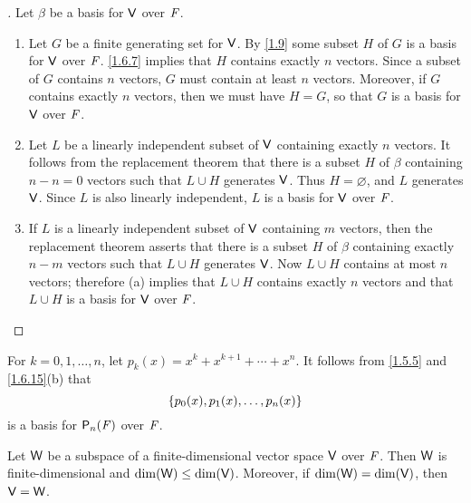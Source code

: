 \begin{proof}[]
	Let \(\beta\) be a basis for \(\mathsf{V}\) over \(\mathit{F}\).
	\begin{enumerate}
		\item Let \(G\) be a finite generating set for \(\mathsf{V}\).
		      By \cref{1.9} some subset \(H\) of \(G\) is a basis for \(\mathsf{V}\) over \(\mathit{F}\).
		      \cref{1.6.7} implies that \(H\) contains exactly \(n\) vectors.
		      Since a subset of \(G\) contains \(n\) vectors, \(G\) must contain at least \(n\) vectors.
		      Moreover, if \(G\) contains exactly \(n\) vectors, then we must have \(H = G\), so that \(G\) is a basis for \(\mathsf{V}\) over \(\mathit{F}\).
		\item Let \(L\) be a linearly independent subset of \(\mathsf{V}\) containing exactly \(n\) vectors.
		      It follows from the replacement theorem that there is a subset \(H\) of \(\beta\) containing \(n - n = 0\) vectors such that \(L \cup H\) generates \(\mathsf{V}\).
		      Thus \(H = \varnothing\), and \(L\) generates \(\mathsf{V}\).
		      Since \(L\) is also linearly independent, \(L\) is a basis for \(\mathsf{V}\) over \(\mathit{F}\).
		\item If \(L\) is a linearly independent subset of \(\mathsf{V}\) containing \(m\) vectors, then the replacement theorem asserts that there is a subset \(H\) of \(\beta\) containing exactly \(n - m\) vectors such that \(L \cup H\) generates \(\mathsf{V}\).
		      Now \(L \cup H\) contains at most \(n\) vectors;
		      therefore (a) implies that \(L \cup H\) contains exactly \(n\) vectors and that \(L \cup H\) is a basis for \(\mathsf{V}\) over \(\mathit{F}\).
	\end{enumerate}
\end{proof}

\begin{eg}\label{1.6.16}
	For \(k = 0, 1, \dots, n\), let \(p_k(x) = x^k + x^{k + 1} + \cdots + x^n\).
	It follows from \cref{1.5.5} and \cref{1.6.15}(b) that
	\[
		\left\lbrace p_0(x), p_1(x), \dots, p_n(x)\right\rbrace
	\]
	is a basis for \(\ps[n]{\F}\) over \(\mathit{F}\).
\end{eg}

\begin{thm}\label{1.11}
	Let \(\mathsf{W}\) be a subspace of a finite-dimensional vector space \(\mathsf{V}\) over \(\mathit{F}\).
	Then \(\mathsf{W}\) is finite-dimensional and \(\dim(\mathsf{W}) \leq \dim(\mathsf{V})\).
	Moreover, if \(\dim(\mathsf{W}) = \dim(\mathsf{V})\), then \(\mathsf{V} = \mathsf{W}\).
\end{thm}

